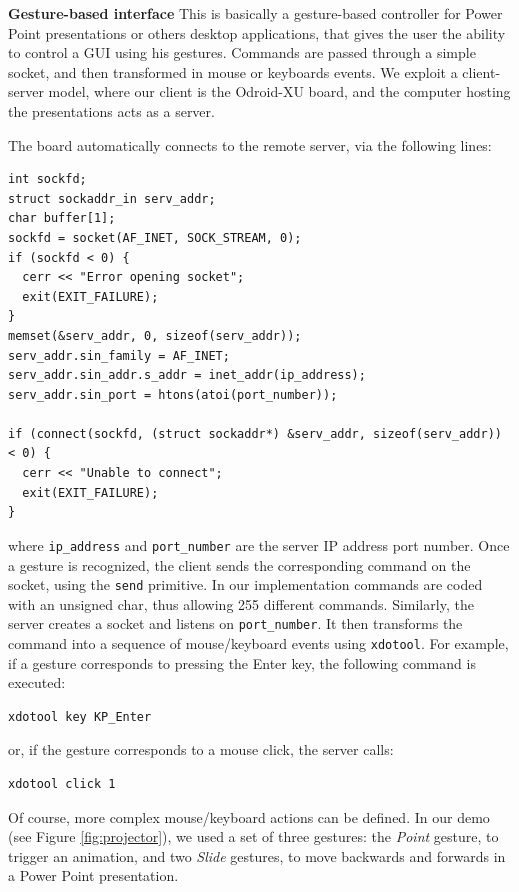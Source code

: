\textbf{Gesture-based interface}
This is basically a gesture-based controller for Power Point presentations or others desktop applications, that gives the user the ability to control a GUI using his gestures. Commands are passed through a simple socket, and then transformed in mouse or keyboards events. We exploit a client-server model, where our client is the Odroid-XU board, and the computer hosting the presentations acts as a server.

The board automatically connects to the remote server, via the following lines:
\begin{lstlisting}[frame=single]
int sockfd;
struct sockaddr_in serv_addr;
char buffer[1];
sockfd = socket(AF_INET, SOCK_STREAM, 0);
if (sockfd < 0) {
  cerr << "Error opening socket";
  exit(EXIT_FAILURE);
}
memset(&serv_addr, 0, sizeof(serv_addr));
serv_addr.sin_family = AF_INET;
serv_addr.sin_addr.s_addr = inet_addr(ip_address);
serv_addr.sin_port = htons(atoi(port_number));

if (connect(sockfd, (struct sockaddr*) &serv_addr, sizeof(serv_addr)) < 0) {
  cerr << "Unable to connect";
  exit(EXIT_FAILURE);
}
\end{lstlisting}
where \verb+ip_address+ and \verb+port_number+ are the server IP address port number. Once a gesture is recognized, the client sends the corresponding command on the socket, using the \verb+send+ primitive. In our implementation commands are coded with an unsigned char, thus allowing 255 different commands. Similarly, the server creates a socket and listens on \verb+port_number+. It then transforms the command into a sequence of mouse/keyboard events using \verb+xdotool+. For example, if a gesture corresponds to pressing the Enter key, the following command is executed:
\begin{lstlisting}[frame=single]
xdotool key KP_Enter
\end{lstlisting}
or, if the gesture corresponds to a mouse click, the server calls:
\begin{lstlisting}[frame=single]
xdotool click 1
\end{lstlisting}

Of course, more complex mouse/keyboard actions can be defined. In our demo (see Figure \ref{fig:projector}), we used a set of three gestures: the \textit{Point} gesture, to trigger an animation, and two \textit{Slide} gestures, to move backwards and forwards in a Power Point presentation.


